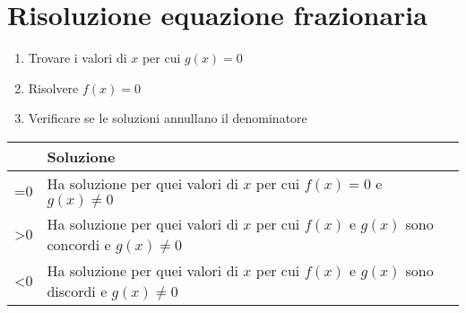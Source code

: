 \section{Risoluzione equazione frazionaria}
\begin{enumerate}
	\item Trovare i valori di $x$ per cui $g(x)=0$
	\item Risolvere $f(x)=0$ 
	\item Verificare se le soluzioni annullano il denominatore 
\end{enumerate}
\begin{center}
	\begin{tabular}{Cp{0.4\textwidth}}
\toprule
	& Soluzione \\ 
\midrule
{}=0	& Ha soluzione per quei valori di $x$ per cui $f(x)=0$ e $g(x)\neq 0$  \\ 
>0	& Ha soluzione per quei valori di $x$ per cui $f(x)$ e $g(x)$ sono concordi e $g(x)\neq 0$  \\ 
<0	& Ha soluzione per quei valori di $x$ per cui $f(x)$ e $g(x)$ sono discordi e $g(x)\neq 0$  \\ 
\bottomrule
\end{tabular}
\end{center}